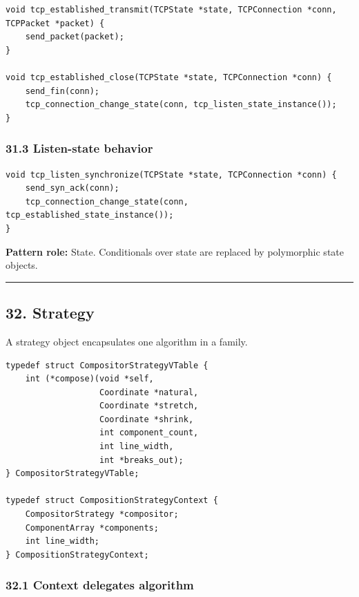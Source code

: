 \documentclass[11pt]{article}
\begin{document}
\begin{verbatim}
void tcp_established_transmit(TCPState *state, TCPConnection *conn, TCPPacket *packet) {
    send_packet(packet);
}

void tcp_established_close(TCPState *state, TCPConnection *conn) {
    send_fin(conn);
    tcp_connection_change_state(conn, tcp_listen_state_instance());
}
\end{verbatim}

\subsubsection{31.3 Listen-state behavior}\label{listen-state-behavior}

\begin{verbatim}
void tcp_listen_synchronize(TCPState *state, TCPConnection *conn) {
    send_syn_ack(conn);
    tcp_connection_change_state(conn, tcp_established_state_instance());
}
\end{verbatim}

\textbf{Pattern role:} State. Conditionals over state are replaced by polymorphic state objects.

\begin{center}\rule{0.5\linewidth}{0.5pt}\end{center}

\subsection{32. Strategy}\label{strategy}

A strategy object encapsulates one algorithm in a family.

\begin{verbatim}
typedef struct CompositorStrategyVTable {
    int (*compose)(void *self,
                   Coordinate *natural,
                   Coordinate *stretch,
                   Coordinate *shrink,
                   int component_count,
                   int line_width,
                   int *breaks_out);
} CompositorStrategyVTable;

typedef struct CompositionStrategyContext {
    CompositorStrategy *compositor;
    ComponentArray *components;
    int line_width;
} CompositionStrategyContext;
\end{verbatim}

\subsubsection{32.1 Context delegates algorithm}\label{context-delegates-algorithm}
\end{document}
